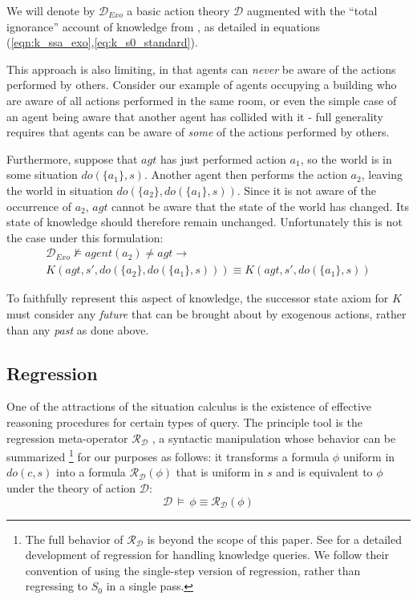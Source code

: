 \documentclass{ifaamas-submission}
\begin{document}
\begin{definition}%
We will denote by $\mathcal{D}_{Exo}$ a basic action theory $\mathcal{D}$
augmented with the {}``total ignorance'' account of knowledge from
\cite{Lesperance99sitcalc_approach}, as detailed in equations (\ref{eqn:k_ssa_exo},\ref{eq:k_s0_standard}).
\end{definition}%
This approach is also limiting, in that agents can \emph{never} be
aware of the actions performed by others. Consider our example of
agents occupying a building who are aware of all actions performed
in the same room, or even the simple case of an agent being aware
that another agent has collided with it - full generality requires
that agents can be aware of \emph{some} of the actions performed by
others.

Furthermore, suppose that $agt$ has just performed action $a_{1}$,
so the world is in some situation $do(\{ a_{1}\},s)$. Another agent
then performs the action $a_{2}$, leaving the world in situation
$do(\{ a_{2}\},do(\{ a_{1}\},s))$. Since it is not aware of the occurrence
of $a_{2}$, $agt$ cannot be aware that the state of the world has
changed. Its state of knowledge should therefore remain unchanged.
Unfortunately this is not the case under this formulation:\begin{multline*}
\mathcal{D}_{Exo}\not\models agent(a_{2})\neq agt\rightarrow\\
K(agt,s',do(\{ a_{2}\},do(\{ a_{1}\},s)))\equiv K(agt,s',do(\{ a_{1}\},s))\end{multline*}


To faithfully represent this aspect of knowledge, the successor state
axiom for $K$ must consider any \emph{future} that can be brought
about by exogenous actions, rather than any \emph{past} as done above.


\subsection{Regression}

One of the attractions of the situation calculus is the existence
of effective reasoning procedures for certain types of query. The
principle tool is the regression meta-operator $\mathcal{R}_{\mathcal{D}}$
\cite{pirri99contributions_sitcalc}, a syntactic manipulation whose
behavior can be summarized%
\footnote{The full behavior of $\mathcal{R}_{\mathcal{D}}$ is beyond the scope
of this paper. See \cite{scherl03sc_knowledge} for a detailed development
of regression for handling knowledge queries. We follow their convention
of using the single-step version of regression, rather than regressing
to $S_{0}$ in a single pass.%
} for our purposes as follows: it transforms a formula $\phi$ uniform
in $do(c,s)$ into a formula $\mathcal{R}_{\mathcal{D}}(\phi)$ that
is uniform in $s$ and is equivalent to $\phi$ under the theory of
action $\mathcal{D}$:\[
\mathcal{D}\,\models\,\phi\equiv\mathcal{R}_{\mathcal{D}}(\phi)\]
\end{document}

